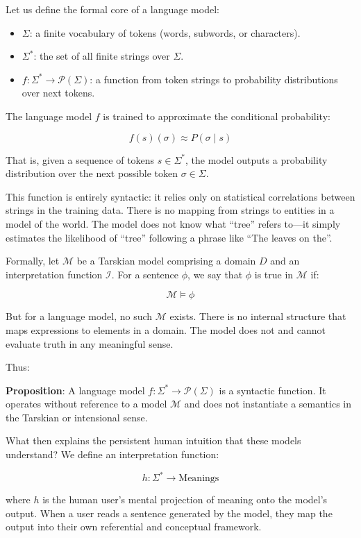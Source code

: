 \documentclass[12pt]{article}
\theoremstyle{plain}
\theoremstyle{definition}
\theoremstyle{remark}
\begin{document}
Let us define the formal core of a language model:

\begin{itemize}
    \item \( \Sigma \): a finite vocabulary of tokens (words, subwords, or characters).
    \item \( \Sigma^* \): the set of all finite strings over \( \Sigma \).
    \item \( f: \Sigma^* \rightarrow \mathcal{P}(\Sigma) \): a function from token strings to probability distributions over next tokens.
\end{itemize}

The language model \( f \) is trained to approximate the conditional probability:

\[
f(s)(\sigma) \approx P(\sigma \mid s)
\]

That is, given a sequence of tokens \( s \in \Sigma^* \), the model outputs a probability distribution over the next possible token \( \sigma \in \Sigma \).

This function is entirely syntactic: it relies only on statistical correlations between strings in the training data. There is no mapping from strings to entities in a model of the world. The model does not know what “tree” refers to—it simply estimates the likelihood of “tree” following a phrase like “The leaves on the”.

Formally, let \( \mathcal{M} \) be a Tarskian model comprising a domain \( D \) and an interpretation function \( \mathcal{I} \). For a sentence \( \phi \), we say that \( \phi \) is true in \( \mathcal{M} \) if:

\[
\mathcal{M} \models \phi
\]

But for a language model, no such \( \mathcal{M} \) exists. There is no internal structure that maps expressions to elements in a domain. The model does not and cannot evaluate truth in any meaningful sense.

Thus:

\textbf{Proposition}: A language model \( f: \Sigma^* \rightarrow \mathcal{P}(\Sigma) \) is a syntactic function. It operates without reference to a model \( \mathcal{M} \) and does not instantiate a semantics in the Tarskian or intensional sense.

What then explains the persistent human intuition that these models understand? We define an interpretation function:

\[
h: \Sigma^* \rightarrow \text{Meanings}
\]

where \( h \) is the human user’s mental projection of meaning onto the model’s output. When a user reads a sentence generated by the model, they map the output into their own referential and conceptual framework.
\end{document}
